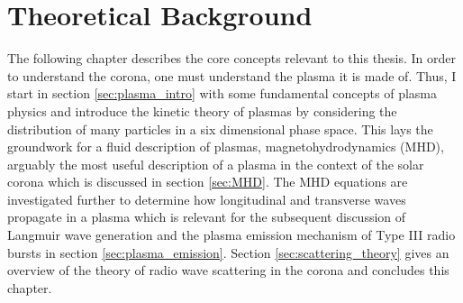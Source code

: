\doublespacing
\chapter{Theoretical Background}
\label{chap:theory}
The following chapter describes the core concepts relevant to this thesis. In order to understand the corona, one must understand the plasma it is made of. Thus, I start in section \ref{sec:plasma_intro} with some fundamental concepts of plasma physics and introduce the kinetic theory of plasmas by considering the distribution of many particles in a six dimensional phase space. This lays the groundwork for a fluid description of plasmas, magnetohydrodynamics (MHD), arguably the most useful description of a plasma in the context of the solar corona which is discussed in section \ref{sec:MHD}. The MHD equations are investigated further to determine how longitudinal and transverse waves propagate in a plasma which is relevant for the subsequent discussion of Langmuir wave generation and the plasma emission mechanism of Type III radio bursts in section \ref{sec:plasma_emission}. Section \ref{sec:scattering_theory} gives an overview of the theory of radio wave scattering in the corona and concludes this chapter. 


